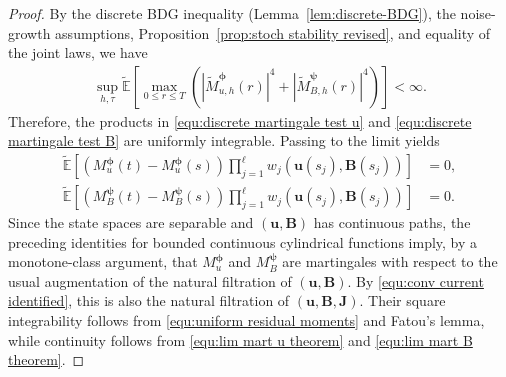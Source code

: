 \documentclass[11pt, reqno]{amsart}
\theoremstyle{definition}
\numberwithin{equation}{section}
\newcommand{\bff}{\boldsymbol}
\newcommand{\bb}{\mathbb}
\newcommand{\abs}[1]{\left|{#1}\right|}
\begin{document}
\begin{proof}
	By the discrete BDG inequality (Lemma~\ref{lem:discrete-BDG}), the noise-growth assumptions,
	Proposition~\ref{prop:stoch stability revised}, and equality of the joint
	laws, we have
	\begin{align}
		\label{equ:uniform residual moments}
		\sup_{h,\tau}
		\widetilde{\bb E}\left[
		\max_{0\le r\le T}
		\left(
		\abs{\widetilde M_{u,h}^{\bff\phi}(r)}^4
		+
		\abs{\widetilde M_{B,h}^{\bff\psi}(r)}^4
		\right)
		\right]
		<\infty .
	\end{align}
	Therefore, the products in
	\eqref{equ:discrete martingale test u} and
	\eqref{equ:discrete martingale test B} are uniformly integrable.
	Passing to the limit yields
	\begin{align*}
	\widetilde{\bb E}\left[
	\left(
	M_u^{\bff\phi}(t)-M_u^{\bff\phi}(s)
	\right)
	\prod_{j=1}^{\ell}
	w_j\left(\bff u(s_j),\bff B(s_j)\right)
	\right]
	&=0,
	\\
	\widetilde{\bb E}\left[
	\left(
	M_B^{\bff\psi}(t)-M_B^{\bff\psi}(s)
	\right)
	\prod_{j=1}^{\ell}
	w_j\left(\bff u(s_j),\bff B(s_j)\right)
	\right]
	&=0.
	\end{align*}
	Since the state spaces are separable and $(\bff u,\bff B)$ has
	continuous paths, the preceding identities for bounded continuous cylindrical
	functions imply, by a monotone-class argument, that
	$M_u^{\bff\phi}$ and $M_B^{\bff\psi}$ are martingales with respect to the
	usual augmentation of the natural filtration of $(\bff u,\bff B)$.
	By \eqref{equ:conv current identified}, this is also the natural filtration of
	$(\bff u,\bff B,\bff J)$. Their square integrability follows from
	\eqref{equ:uniform residual moments} and Fatou's lemma, while continuity
	follows from \eqref{equ:lim mart u theorem} and
	\eqref{equ:lim mart B theorem}.
	

\end{proof}
\end{document}
